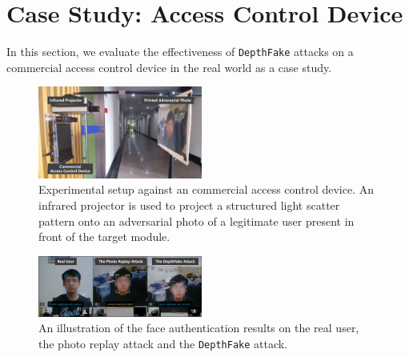 \section{Case Study: Access Control Device}
In this section, we evaluate the effectiveness of \texttt{DepthFake} attacks on a commercial access control device in the real world as a case study.

\begin{figure}[pt]
	\centerline{\includegraphics[width = 0.48\textwidth]{figures/commercial_setup.png}}
	\vspace{-0.1in}
	\caption{Experimental setup against an commercial access control device. An infrared projector is used to project a structured light scatter pattern onto an adversarial photo of a legitimate user present in front of the target module.}
	\vspace{-0.1in}
	\label{setup_2}
\end{figure}
\begin{figure}[pt]
	\centerline{\includegraphics[width = 0.48\textwidth]{figures/commercial_compare.png}}
	\vspace{-0.1in}
	\caption{An illustration of the face authentication results on the real user, the photo replay attack and the \texttt{DepthFake} attack.}
	\vspace{-0.1in}
	\label{compare}
\end{figure}

